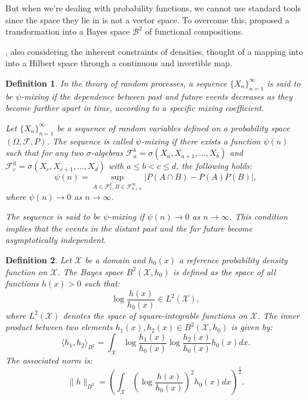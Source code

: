 \documentclass[
	12pt,				%
	oneside,			%
	a4paper,			%
	english,			%
	brazil				%
	]{abntex2ppgsi}
\newtheorem{theorem}{Theorem} %
\newtheorem{lemma}{Lemma}     %
\newtheorem{definition}{Definition}
\begin{document}
But when we're dealing with probability functions, we cannot use standard tools since the space they lie in is not a vector space. To overcome this,  proposed a transformation into a Bayes space $\mathcal{B}^2$ of functional compositions.

, also considering the inherent constraints of densities, thought of a mapping into into a Hilbert space through a continuous and invertible map.




\begin{definition}
In the theory of random processes, a sequence $\{ X_n \}_{n=1}^{\infty}$ is said to be $\psi$-mixing if the dependence between past and future events decreases as they become further apart in time, according to a specific mixing coefficient.

Let $\{ X_n \}_{n=1}^{\infty}$ be a sequence of random variables defined on a probability space $(\Omega, \mathcal{F}, P)$. The sequence is called \emph{$\psi$-mixing} if there exists a function $\psi(n)$ such that for any two $\sigma$-algebras $\mathcal{F}_a^b = \sigma(X_a, X_{a+1}, \ldots, X_b)$ and $\mathcal{F}_c^d = \sigma(X_c, X_{c+1}, \ldots, X_d)$ with $a \leq b < c \leq d$, the following holds:
\[
\psi(n) = \sup_{A \in \mathcal{F}_1^k, B \in \mathcal{F}_{k+n}^\infty} |P(A \cap B) - P(A)P(B)|,
\]
where $\psi(n) \to 0$ as $n \to \infty$.

The sequence is said to be $\psi$-mixing if $\psi(n) \to 0$ as $n \to \infty$. This condition implies that the events in the distant past and the far future become asymptotically independent.
\end{definition}

\begin{definition}

Let $\mathcal{X}$ be a domain and $h_0(x)$ a reference probability density function on $\mathcal{X}$. The \emph{Bayes space} $B^2(\mathcal{X}, h_0)$ is defined as the space of all functions $h(x) > 0$ such that:
\[
\log \frac{h(x)}{h_0(x)} \in L^2(\mathcal{X}),
\]
where $L^2(\mathcal{X})$ denotes the space of square-integrable functions on $\mathcal{X}$. The inner product between two elements $h_1(x), h_2(x) \in B^2(\mathcal{X}, h_0)$ is given by:
\[
\langle h_1, h_2 \rangle_{B^2} = \int_{\mathcal{X}} \log \frac{h_1(x)}{h_0(x)} \log \frac{h_2(x)}{h_0(x)} h_0(x) dx.
\]
The associated norm is:
\[
\| h \|_{B^2} = \left( \int_{\mathcal{X}} \left( \log \frac{h(x)}{h_0(x)} \right)^2 h_0(x) dx \right)^{\frac{1}{2}}.
\]
\end{definition}
\end{document}
